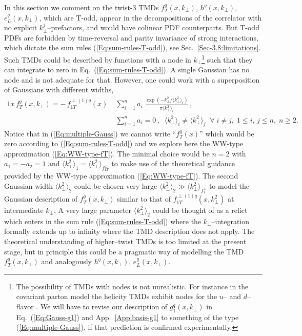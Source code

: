 \documentclass[a4paper,11pt]{article}
\newcommand{\la}{\langle}
\newcommand{\ra}{\rangle}
\def\kperp{k_\perp}
\begin{document}
{In this section we comment on the twist-3 TMDs 
$f_T^q(x,\kperp)$,  $h^q(x,\kperp)$, $e_L^q(x,\kperp)$,  
which are T-odd, appear in the decompositions of the correlator with no 
explicit $k_\perp^j$--prefactors, and would have colinear PDF counterparts. 
But T-odd PDFs are forbidden by time-reversal and parity invariance of 
strong interactions, which dictate the sum rules (\ref{Eq:sum-rules-T-odd}), 
see Sec.~\ref{Sec-3.8:limitations}. 
Such TMDs could be described by functions with a node in 
$k_\perp$\footnote{The possibility of TMDs with nodes is not unrealistic.
	For instance in the covariant parton model the helicity TMDs 
	exhibit nodes for the $u$-- and $d$--flavor \cite{Efremov:2010mt}.
	We will have to revise our description of $g_1^q(x,\kperp)$ 
	in Eq.~(\ref{Eq:Gauss-g1}) and App.~\ref{App:basis-g1} to something 
	of the type (\ref{Eq:multiple-Gauss}), if that prediction is 
	confirmed experimentally. }
such that they can integrate to zero in Eq.~(\ref{Eq:sum-rules-T-odd}).
A single Gaussian has no node and is not adequate for that.
However, one could work with a superposition of Gaussians
with different widths, 
\begin{alignat}{1}
	x \, f_T^q(x,\kperp) =  - \, f_{1T}^{\perp (1)q}(x)\;
	&\sum\limits_{i=1}^{n} a_i\;
	\frac{\exp(-\kperp^2/\la\kperp^2\ra_i^{ })}{\pi\la\kperp^2\ra_i^{ }}\,,
	\label{Eq:multiple-Gauss}\\
	&\sum\limits_{i=1}^n a_i = 0\,, \;\;
	\la\kperp^2\ra_i^{ }\neq\la\kperp^2\ra_j^{ }\;\;\forall\;i\neq j,
	\; 1\le i,\,j\le n,\;n\ge 2.\nonumber
\end{alignat}
Notice that in (\ref{Eq:multiple-Gauss}) we cannot write ``$f_T^q(x)$'' 
which would be zero according to (\ref{Eq:sum-rules-T-odd}) and we
explore here the WW-type approximation (\ref{Eq:WW-type-fT}). 
The minimal choice would be $n=2$ with $a_1=-a_2=1$ and
$\la\kperp^2\ra_1^{ } = \la\kperp^2\ra_{f_{1T}^\perp}$ to make use 
of the theoretical guidance provided by the WW-type approximation 
(\ref{Eq:WW-type-fT}). 
The second Gaussian width $\la\kperp^2\ra_2^{ }$ could be chosen
very large $\la\kperp^2\ra_2^{ } \gg \la\kperp^2\ra_{f_1^\perp}$ to
model the Gaussian description of $f_T^{q}(x,\kperp)$ similar to 
that of $f_{1T}^{\perp(1)q}(x,\kperp^2)$ at intermediate $\kperp$.
A very large parameter $\la\kperp^2\ra_2^{ }$ could be thought of as
a relict which enters in the sum rule (\ref{Eq:sum-rules-T-odd}) 
where the $\kperp$--integration formally extends up to infinity 
where the TMD description does not apply. The theoretical
understanding of higher--twist TMDs is too limited at
the present stage, but in principle this could be a 
pragmatic way of modelling the TMD $f_T^q(x,\kperp)$
and analogously $h^q(x,\kperp)$, $e_L^q(x,\kperp)$.

{}

}
\end{document}
